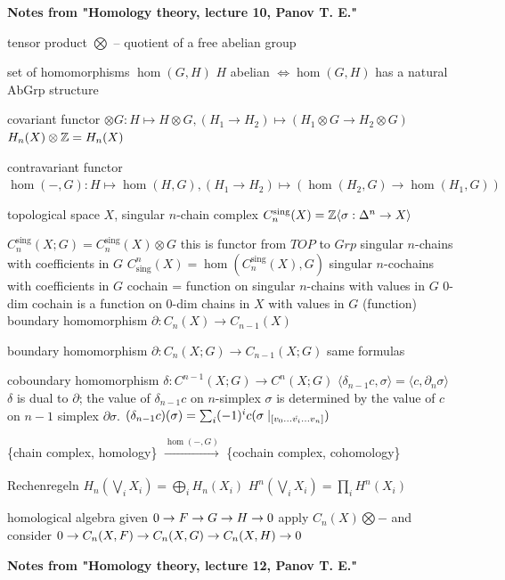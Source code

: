 \begin{outline}
\0 \textbf{Notes from "Homology theory, lecture 10, Panov T. E."}

\1 tensor product $\bigotimes$ -- quotient of a free abelian group

\1 set of homomorphisms $\hom(G,H)$
    \2 $H$ abelian $\iff \hom(G,H)$ has a natural AbGrp structure

\1 covariant functor $\otimes G: H\mapsto H\otimes G, (H_1\rightarrow H_2) \mapsto (H_1 \otimes G \rightarrow H_2 \otimes G)$
    \2 $H_n(X)\otimes \mathbb{Z} = H_n(X)$

\1 contravariant functor $\hom(-,G): H \mapsto \hom(H,G), (H_1\rightarrow H_2) \mapsto (\hom(H_2,G)\rightarrow \hom(H_1,G))$

\1 topological space $X$, singular $n$-chain complex $C^{\text{sing}}_n(X)=\mathbb{Z}\langle \sigma: \Delta^n\rightarrow X\rangle$

\1 $C^{\text{sing}}_n(X;G) = C^{\text{sing}}_n(X)\otimes G$
    \2 this is functor from $TOP$ to $Grp$
    \2 singular $n$-chains with coefficients in $G$
\1 $C_{\text{sing}}^n(X)=\hom(C^{\text{sing}}_n(X),G)$
    \2 singular $n$-cochains with coefficients in $G$
    \2 cochain = function on singular $n$-chains with values in $G$
    \2 $0$-dim cochain is a function on $0$-dim chains in $X$ with values in $G$ (function)
\1 boundary homomorphism $\partial: C_n(X)\rightarrow C_{n-1}(X)$

\1 boundary homomorphism $\partial: C_n(X;G)\rightarrow C_{n-1}(X;G)$
    \2 same formulas

\1 coboundary homomorphism $\delta:C^{n-1}(X;G) \rightarrow C^n(X;G)$
    \2 $\langle \delta_{n-1}c, \sigma \rangle = \langle c, \partial_n\sigma\rangle$
    \2 $\delta$ is dual to $\partial$; the value of $\delta_{n-1}c$ on $n$-simplex $\sigma$ is determined by the value of $c$ on $n-1$ simplex $\partial \sigma$.
    \2 $(\delta_{n-1}c)(\sigma) = \sum_i (-1)^i c(\sigma \mid_{[v_0\ldots\Hat{v_i}\ldots v_n]})$

\1 \{chain complex, homology\} $\xrightarrow[]{\hom(-,G)}$ \{cochain complex, cohomology\}

\1 Rechenregeln
    \2 $H_n(\bigvee_i X_i)=\bigoplus_i H_n(X_i)$
    \2 $H^n(\bigvee_i X_i)=\prod_i H^n(X_i)$

\1 homological algebra
    \2 given $0\rightarrow F \rightarrow G \rightarrow H \rightarrow 0$ apply $C_n(X)\bigotimes -$ and consider $0\rightarrow C_n(X,F)\rightarrow C_n(X,G)\rightarrow C_n(X,H)\rightarrow 0$

\0 \textbf{Notes from "Homology theory, lecture 12, Panov T. E."}


\end{outline}
